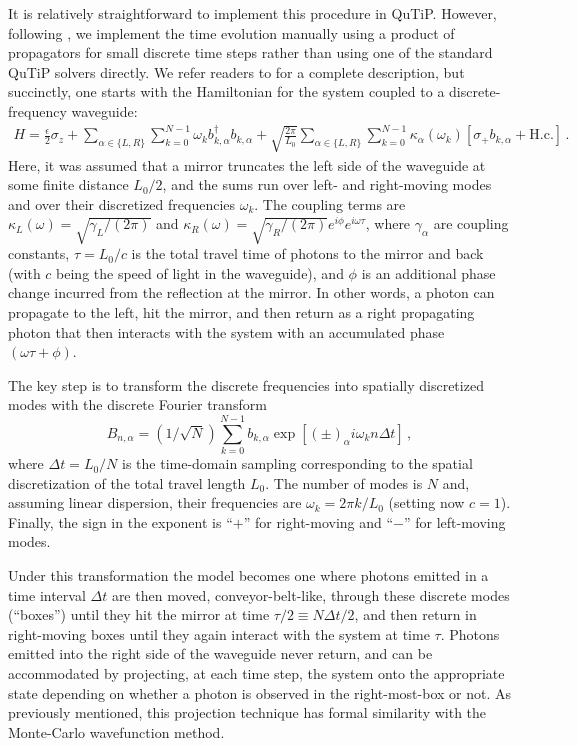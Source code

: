 \documentclass[preprint,3p,sort&compress]{elsarticle}
\begin{document}
It is relatively straightforward to implement this procedure in QuTiP. However, following \cite{stephenhughes1}, we implement the time evolution manually using a product of propagators for small discrete time steps rather than using one of the standard QuTiP solvers directly. We refer readers to \cite{stephenhughes1} for a complete description, but succinctly, one starts with the Hamiltonian for the system coupled to a discrete-frequency waveguide:
\begin{align}
H = \frac{\epsilon}{2} \sigma_z + \sum_{\alpha \in \{L, R\}} \sum_{k={0}}^{N-1} \omega_k b_{k,\alpha}^{\dagger}b_{k,\alpha} 
+  \sqrt{\frac{2\pi}{L_0}} \sum_{\alpha \in \{L, R\}} \sum_{k={0}}^{N-1} \kappa_{\alpha}(\omega_k)\left[ \sigma_+ b_{k,\alpha} + \text{H.c.} \right] \, .
\end{align}
Here, it was assumed that a mirror truncates the left side of the waveguide at some finite distance $L_0/2$, and the sums run over left- and right-moving modes and over their discretized frequencies $\omega_k$. The coupling terms are $\kappa_L(\omega) = \sqrt{\gamma_L/(2\pi)}$ and $\kappa_R(\omega)=\sqrt{\gamma_R/(2\pi)} e^{i\phi} e^{i\omega\tau}$, where $\gamma_{\alpha}$ are coupling constants, $\tau = L_0 / c$ is the total travel time of photons to the mirror and back (with $c$ being the speed of light in the waveguide), and $\phi$ is an additional phase change incurred from the reflection at the mirror. In other words, a photon can propagate to the left, hit the mirror, and then return as a right propagating photon that then interacts with the system with an accumulated phase $(\omega \tau + \phi)$.  

The key step is to transform the discrete frequencies into spatially discretized modes with the discrete Fourier transform
\begin{equation}
B_{n,\alpha} =(1/\sqrt{N})\sum_{k=0}^{N-1} b_{k,\alpha}\exp[(\pm)_\alpha i\omega_k n \Delta t]\, ,
\end{equation} 
where $\Delta t=L_0/N$ is the time-domain sampling corresponding to the spatial discretization of the total travel length $L_0$. The number of modes is $N$ and, assuming linear dispersion, their frequencies are $\omega_k = 2\pi k/L_0$ (setting now $c=1$). Finally, the sign in the exponent is ``$+$'' for right-moving and ``$-$'' for left-moving modes.

Under this transformation the model becomes one where photons emitted in a time interval $\Delta t$ are then moved, conveyor-belt-like, through these discrete modes (``boxes'') until they hit the mirror at time $\tau/2 \equiv N \Delta t/2$, and then return in right-moving boxes until they again interact with the system at time $\tau$.  Photons emitted into the right side of the waveguide never return, and can be accommodated by projecting, at each time step, the system onto the appropriate state depending on whether a photon is observed in the right-most-box or not. As previously mentioned, this projection technique has formal similarity with the Monte-Carlo wavefunction method.
\end{document}
